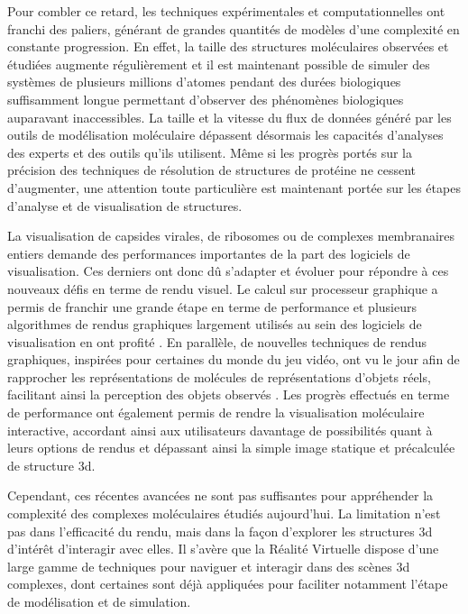 Pour combler ce retard, les techniques expérimentales et computationnelles ont franchi des paliers, générant de grandes quantités de modèles d'une complexité en constante progression. En effet, la taille des structures moléculaires observées et étudiées augmente régulièrement et il est maintenant possible de simuler des systèmes de plusieurs millions d'atomes pendant des durées biologiques suffisamment longue permettant d'observer des phénomènes biologiques auparavant inaccessibles. La taille et la vitesse du flux de données généré par les outils de modélisation moléculaire dépassent désormais les capacités d'analyses des experts et des outils qu'ils utilisent. Même si les progrès portés sur la précision des techniques de résolution de structures de protéine ne cessent d'augmenter, une attention toute particulière est maintenant portée sur les étapes d'analyse et de visualisation de structures.

La visualisation de capsides virales, de ribosomes ou de complexes membranaires entiers demande des performances importantes de la part des logiciels de visualisation. Ces derniers ont donc dû s'adapter et évoluer pour répondre à ces nouveaux défis en terme de rendu visuel. Le calcul sur processeur graphique a permis de franchir une grande étape en terme de performance et plusieurs algorithmes de rendus graphiques largement utilisés au sein des logiciels de visualisation en ont profité \cite{chavent_gpu-powered_2011}. En parallèle, de nouvelles techniques de rendus graphiques, inspirées pour certaines du monde du jeu vidéo, ont vu le jour afin de rapprocher les représentations de molécules de représentations d'objets réels, facilitant ainsi la perception des objets observés \cite{lv_game_2013}. Les progrès effectués en terme de performance ont également permis de rendre la visualisation moléculaire interactive,  accordant ainsi aux utilisateurs davantage de possibilités quant à leurs options de rendus et dépassant ainsi la simple image statique et précalculée de structure 3d.

Cependant, ces récentes avancées ne sont pas suffisantes pour appréhender la complexité des complexes moléculaires étudiés aujourd'hui. La limitation n'est pas dans l'efficacité du rendu, mais dans la façon d'explorer les structures 3d d'intérêt d'interagir avec elles. Il s'avère que la Réalité Virtuelle dispose d'une large gamme de techniques pour naviguer et interagir dans des scènes 3d complexes, dont certaines sont déjà appliquées pour faciliter notamment l'étape de modélisation et de simulation.


